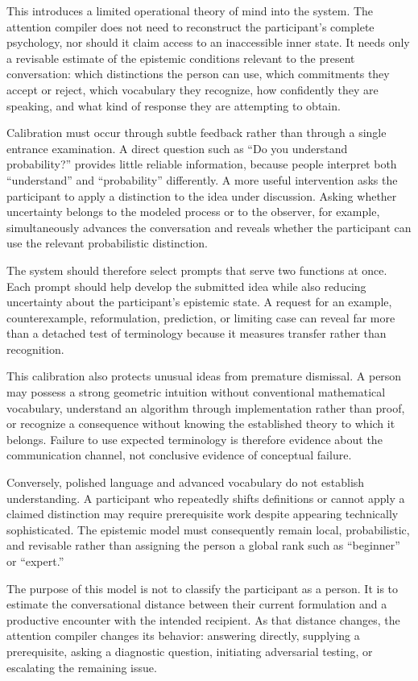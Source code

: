 \documentclass[11pt]{article}
\begin{document}
This introduces a limited operational theory of mind into the system. The attention compiler does not need to reconstruct the participant's complete psychology, nor should it claim access to an inaccessible inner state. It needs only a revisable estimate of the epistemic conditions relevant to the present conversation: which distinctions the person can use, which commitments they accept or reject, which vocabulary they recognize, how confidently they are speaking, and what kind of response they are attempting to obtain.

Calibration must occur through subtle feedback rather than through a single entrance examination. A direct question such as ``Do you understand probability?'' provides little reliable information, because people interpret both ``understand'' and ``probability'' differently. A more useful intervention asks the participant to apply a distinction to the idea under discussion. Asking whether uncertainty belongs to the modeled process or to the observer, for example, simultaneously advances the conversation and reveals whether the participant can use the relevant probabilistic distinction.

The system should therefore select prompts that serve two functions at once. Each prompt should help develop the submitted idea while also reducing uncertainty about the participant's epistemic state. A request for an example, counterexample, reformulation, prediction, or limiting case can reveal far more than a detached test of terminology because it measures transfer rather than recognition.

This calibration also protects unusual ideas from premature dismissal. A person may possess a strong geometric intuition without conventional mathematical vocabulary, understand an algorithm through implementation rather than proof, or recognize a consequence without knowing the established theory to which it belongs. Failure to use expected terminology is therefore evidence about the communication channel, not conclusive evidence of conceptual failure.

Conversely, polished language and advanced vocabulary do not establish understanding. A participant who repeatedly shifts definitions or cannot apply a claimed distinction may require prerequisite work despite appearing technically sophisticated. The epistemic model must consequently remain local, probabilistic, and revisable rather than assigning the person a global rank such as ``beginner'' or ``expert.''

The purpose of this model is not to classify the participant as a person. It is to estimate the conversational distance between their current formulation and a productive encounter with the intended recipient. As that distance changes, the attention compiler changes its behavior: answering directly, supplying a prerequisite, asking a diagnostic question, initiating adversarial testing, or escalating the remaining issue.
\end{document}
